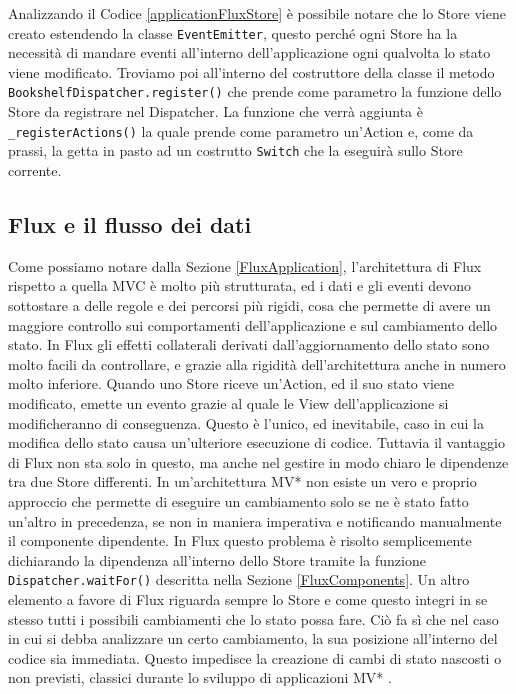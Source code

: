 Analizzando il Codice \ref{applicationFluxStore} è possibile notare che lo Store viene creato estendendo la classe \texttt{EventEmitter}, questo perché ogni Store ha la necessità di mandare eventi all'interno dell'applicazione ogni qualvolta lo stato viene modificato. Troviamo poi all'interno del costruttore della classe il metodo \texttt{BookshelfDispatcher.register()} che prende come parametro la funzione dello Store da registrare nel Dispatcher. La funzione che verrà aggiunta è \texttt{_registerActions()} la quale prende come parametro un'Action e, come da prassi, la getta in pasto ad un costrutto \texttt{Switch} che la eseguirà sullo Store corrente.


\subsection{Flux e il flusso dei dati}
Come possiamo notare dalla Sezione \ref{FluxApplication}, l'architettura di Flux rispetto a quella MVC è molto più strutturata, ed i dati e gli eventi devono sottostare a delle regole e dei percorsi più rigidi, cosa che permette di avere un maggiore controllo sui comportamenti dell'applicazione e sul cambiamento dello stato. In Flux gli effetti collaterali derivati dall'aggiornamento dello stato sono molto facili da controllare, e grazie alla rigidità dell'architettura anche in numero molto inferiore. Quando uno Store riceve un'Action, ed il suo stato viene modificato, emette un evento grazie al quale le View dell'applicazione si modificheranno di conseguenza. Questo è l'unico, ed inevitabile, caso in cui la modifica dello stato causa un'ulteriore esecuzione di codice. 
Tuttavia il vantaggio di Flux non sta solo in questo, ma anche nel gestire in modo chiaro le dipendenze tra due Store differenti. In un'architettura MV* non esiste un vero e proprio approccio che permette di eseguire un cambiamento solo se ne è stato fatto un'altro in precedenza, se non in maniera imperativa e notificando manualmente il componente dipendente. In Flux questo problema è risolto semplicemente dichiarando la dipendenza all'interno dello Store tramite la funzione \texttt{Dispatcher.waitFor()} descritta nella Sezione \ref{FluxComponents}.
Un altro elemento a favore di Flux riguarda sempre lo Store e come questo integri in se stesso tutti i possibili cambiamenti che lo stato possa fare. Ciò fa sì che nel caso in cui si debba analizzare un certo cambiamento, la sua posizione all'interno del codice sia immediata. Questo impedisce la creazione di cambi di stato nascosti o non previsti, classici durante lo sviluppo di applicazioni MV* \cite{boduch2016flux}.

